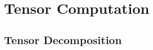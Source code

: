 \chapter{Tensor Computation}
\label{Ch: 9-Ten-Com}

\section{Tensor Decomposition}
\label{Sec: 9-Ten-Dec}